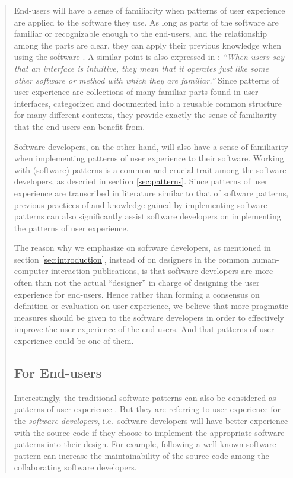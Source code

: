 \documentclass[a4paper,titlepage]{article}
\begin{document}
\begin{quote}
End-users will have a sense of familiarity when patterns of user
experience are applied to the software they use. As long as parts of
the software are familiar or recognizable enough to the end-users, and
the relationship among the parts are clear, they can apply their
previous knowledge when using the software
\citep[p.~xiii]{patterns:tidwell}. A similar point is also expressed
in \citet[p.~150]{humane:raskin}: {\it ``When users say that an
  interface is intuitive, they mean that it operates just like some
  other software or method with which they are familiar.''} Since
patterns of user experience are collections of many familiar parts
found in user interfaces, categorized and documented into a reusable
common structure for many different contexts, they provide exactly the
sense of familiarity that the end-users can benefit from.

Software developers, on the other hand, will also have a sense of
familiarity when implementing patterns of user experience to their
software. Working with (software) patterns is a common and crucial
trait among the software developers, as descried in section
\ref{sec:patterns}. Since patterns of user experience are transcribed
in literature similar to that of software patterns, previous practices
of and knowledge gained by implementing software patterns can also
significantly assist software developers on implementing the patterns
of user experience.

The reason why we emphasize on software developers, as mentioned in
section \ref{sec:introduction}, instead of on designers in the common
human-computer interaction publications, is that software developers
are more often than not the actual ``designer'' in charge of designing
the user experience for end-users. Hence rather than forming a
consensus on definition or evaluation on user experience, we believe
that more pragmatic measures should be given to the software
developers in order to effectively improve the user experience of the
end-users. And that patterns of user experience could be one of them.

\subsection{For End-users}
Interestingly, the traditional software patterns can also be
considered as patterns of user experience \citep{pux:blackwell}. But
they are referring to user experience for the \textit{software
  developers}, i.e.\ software developers will have better experience
with the source code if they choose to implement the appropriate
software patterns into their design. For example, following a well
known software pattern can increase the maintainability of the source
code among the collaborating software developers.


\end{quote}
\end{document}
